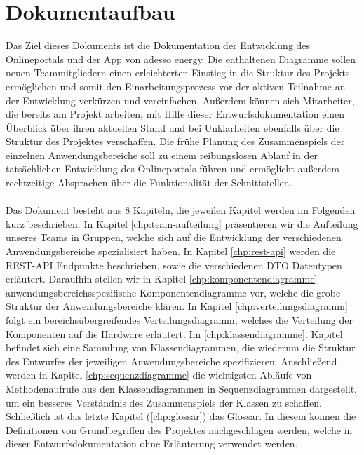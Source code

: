 \section{Dokumentaufbau}\label{sec:dokumentaufbau}
Das Ziel dieses Dokuments ist die Dokumentation der Entwicklung des Onlineportals und der App von adesso energy. 
Die enthaltenen Diagramme sollen neuen Teammitgliedern einen erleichterten Einstieg in die Struktur des Projekts ermöglichen 
und somit den Einarbeitungsprozess vor der aktiven Teilnahme an der Entwicklung verkürzen und vereinfachen.  
Außerdem können sich Mitarbeiter, die bereits am Projekt arbeiten, mit Hilfe dieser Entwurfsdokumentation einen Überblick über 
ihren aktuellen Stand und bei Unklarheiten ebenfalls über die Struktur des Projektes verschaffen.
Die frühe Planung des Zusammenspiels der einzelnen Anwendungsbereiche soll zu einem reibungslosen Ablauf 
in der tatsächlichen Entwicklung des Onlineportals führen und ermöglicht außerdem rechtzeitige Absprachen über die Funktionalität 
der Schnittstellen.
\\\\
Das Dokument besteht aus 8 Kapiteln, die jeweilen Kapitel werden im Folgenden kurz beschrieben. In Kapitel \ref{chp:team-aufteilung} präsentieren wir die Aufteilung unseres Teams in Gruppen, welche sich auf die Entwicklung der verschiedenen Anwendungsbereiche spezialisiert haben. In Kapitel \ref{chp:rest-api} werden die REST-API Endpunkte beschrieben, sowie die verschiedenen DTO Datentypen erläutert. Daraufhin stellen wir in Kapitel \ref{chp:komponentendiagramme} anwendungsbereichsspezifische Komponentendiagramme vor, welche die grobe Struktur der Anwendungsbereiche klären. In Kapitel \ref{chp:verteilungsdiagramm} folgt ein bereichsübergreifendes Verteilungsdiagramm, welches die Verteilung der Komponenten auf die Hardware erläutert. 
Im \ref{chp:klassendiagramme}. Kapitel befindet sich eine Sammlung von Klassendiagrammen, die wiederum die Struktur des Entwurfes der jeweiligen Anwendungsbereiche spezifizieren. Anschließend werden in Kapitel \ref{chp:sequenzdiagramme} die wichtigsten Abläufe von Methodenaufrufe aus den Klassendiagrammen in Sequenzdiagrammen dargestellt, um ein besseres Verständnis des Zusammenspiels der Klassen zu schaffen. Schließlich ist das letzte Kapitel (\ref{chp:glossar}) das Glossar. 
In diesem können die Definitionen von Grundbegriffen des Projektes nachgeschlagen werden, welche in 
dieser Entwurfsdokumentation ohne Erläuterung verwendet werden. \newpage

